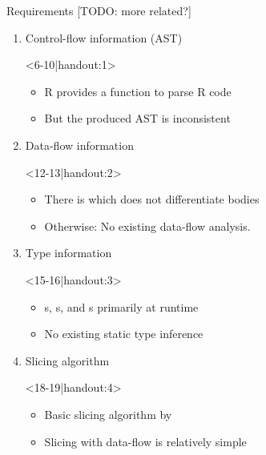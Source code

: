 \begin{frame}[c]{Requirements [TODO: more related?]}%
\vspace*{2mm}\begin{enumerate}
   \itemsep12pt
   \item<2-> Control-flow information (AST) \begin{onlyenv}<6-10|handout:1>
         \begin{itemize}
         \item<6-> R provides a  function to parse R code
         \item<7-> But the produced AST is inconsistent
      \end{itemize}
   \end{onlyenv}
   \item<3-> Data-flow information \begin{onlyenv}<12-13|handout:2>
      \begin{itemize}
      \item<12-> There is \textsuperscript{\color{gray}\cite{lang_codedepends_2018}} which does not differentiate bodies
      \item<13-> Otherwise: No existing data-flow analysis.
   \end{itemize}
\end{onlyenv}
   \item<4-> Type information \begin{onlyenv}<15-16|handout:3>
      \begin{itemize}
      \item<15-> s, s, and s primarily at runtime
      \item<16-> No existing static type inference
   \end{itemize}
\end{onlyenv}
   \item<5-> Slicing algorithm \begin{onlyenv}<18-19|handout:4>
      \begin{itemize}
      \item<18-> Basic slicing algorithm by \citeauthor{weiser_program_1984}\textsuperscript{\color{gray}\cite{weiser_program_1984}}%
      \item<19-> Slicing with data-flow is relatively simple
   \end{itemize}

\end{onlyenv}
\end{enumerate}
\end{frame}

